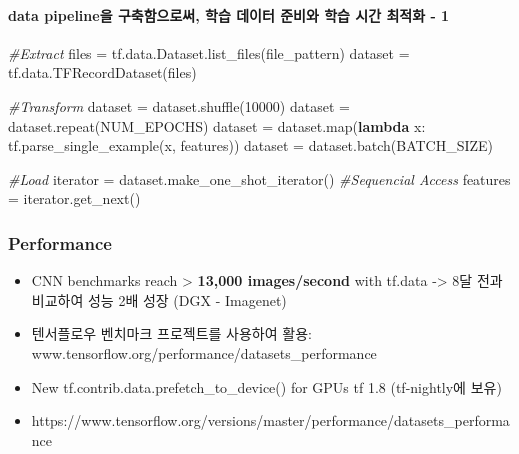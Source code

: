 \documentclass[11pt]{article}
\newenvironment{Shaded}{}{}
\newcommand{\KeywordTok}[1]{\textcolor[rgb]{0.00,0.44,0.13}{\textbf{{#1}}}}
\newcommand{\DecValTok}[1]{\textcolor[rgb]{0.25,0.63,0.44}{{#1}}}
\newcommand{\CommentTok}[1]{\textcolor[rgb]{0.38,0.63,0.69}{\textit{{#1}}}}
\newcommand{\NormalTok}[1]{{#1}}
\newcommand{\OperatorTok}[1]{\textcolor[rgb]{0.40,0.40,0.40}{{#1}}}
\newcommand{\BuiltInTok}[1]{{#1}}
\begin{document}
\hypertarget{data-pipelineuxc744-uxad6cuxcd95uxd568uxc73cuxb85cuxc368-uxd559uxc2b5-uxb370uxc774uxd130-uxc900uxbe44uxc640-uxd559uxc2b5-uxc2dcuxac04-uxcd5cuxc801uxd654---1}{%
\paragraph{data pipeline을 구축함으로써, 학습 데이터 준비와 학습 시간
최적화 -
1}\label{data-pipelineuxc744-uxad6cuxcd95uxd568uxc73cuxb85cuxc368-uxd559uxc2b5-uxb370uxc774uxd130-uxc900uxbe44uxc640-uxd559uxc2b5-uxc2dcuxac04-uxcd5cuxc801uxd654---1}}

\begin{Shaded}
\begin{Highlighting}[]
\CommentTok{#Extract}
\NormalTok{files }\OperatorTok{=}\NormalTok{ tf.data.Dataset.list_files(file_pattern)}
\NormalTok{dataset }\OperatorTok{=}\NormalTok{ tf.data.TFRecordDataset(files)}

\CommentTok{#Transform}
\NormalTok{dataset }\OperatorTok{=}\NormalTok{ dataset.shuffle(}\DecValTok{10000}\NormalTok{)}
\NormalTok{dataset }\OperatorTok{=}\NormalTok{ dataset.repeat(NUM_EPOCHS)}
\NormalTok{dataset }\OperatorTok{=}\NormalTok{ dataset.}\BuiltInTok{map}\NormalTok{(}\KeywordTok{lambda}\NormalTok{ x: tf.parse_single_example(x, features))}
\NormalTok{dataset }\OperatorTok{=}\NormalTok{ dataset.batch(BATCH_SIZE)}

\CommentTok{#Load}
\NormalTok{iterator }\OperatorTok{=}\NormalTok{ dataset.make_one_shot_iterator() }\CommentTok{#Sequencial Access}
\NormalTok{features }\OperatorTok{=}\NormalTok{ iterator.get_next()}
\end{Highlighting}
\end{Shaded}

    \hypertarget{performance}{%
\subsubsection{Performance}\label{performance}}

\begin{itemize}
\item
  CNN benchmarks reach \textgreater{} \textbf{13,000 images/second} with
  tf.data -\textgreater{} 8달 전과 비교하여 성능 2배 성장 (DGX -
  Imagenet) 
\item
  텐서플로우 벤치마크 프로젝트를 사용하여 활용:
  www.tensorflow.org/performance/datasets\_performance
\item
  New tf.contrib.data.prefetch\_to\_device() for GPUs tf 1.8
  (tf-nightly에 보유)
\item
  https://www.tensorflow.org/versions/master/performance/datasets\_performance
\end{itemize}
\end{document}
